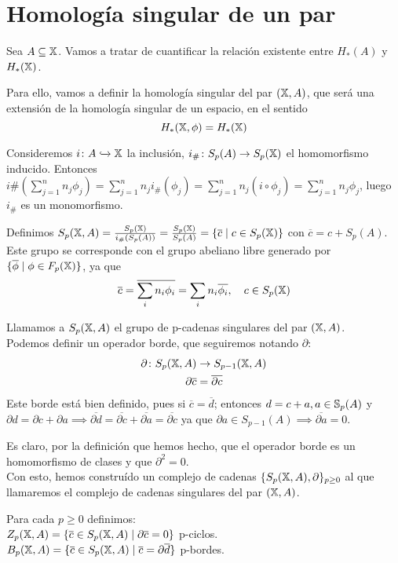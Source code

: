 \section{Homología singular de un par}

Sea $A \subseteq \X$. Vamos a tratar de cuantificar la relación existente entre $H_*(A)$ y $H_*(\X)$.

Para ello, vamos a definir la homología singular del par $(\X, A)$, que será una extensión de la homología singular de un espacio, en el sentido
\[H_*(\X, \phi) = H_*(\X)\]

Consideremos $i \colon A \xhookrightarrow{} \X$ la inclusión, $i_\# \colon S_p(A) \to \SX{p}$ el homomorfismo inducido.
Entonces $i\#(\sum\limits_{j = 1}^n n_j \phi_j) = \sum\limits_{j = 1}^n n_j i_\#(\phi_j) = \sum\limits_{j = 1}^n n_j (i \circ \phi_j) = \sum\limits_{j = 1}^n n_j \phi_j$,
luego $i_\#$ es un monomorfismo.

Definimos $S_p(\X, A) = \frac{\SX{p}}{i_\#(S_p(A))} = \frac{\SX{p}}{S_p(A)} = \{\overline{c} \mid c \in \SX{p} \}$ con $\overline{c} = c + S_p(A)$.
Este grupo se corresponde con el grupo abeliano libre generado por $\{\overline{\phi} \mid \phi \in \FX{p}\}$, ya que
\[\overline{c} = \overline{\sum_i n_i \phi_i} = \sum_i n_i \overline{\phi_i}, \quad c \in \SX{p} \]

Llamamos a $S_p(\X, A)$ el grupo de p-cadenas singulares del par $(\X, A)$. \\
Podemos definir un operador borde, que seguiremos notando $\partial$:
\begin{align*}
  \partial \colon S_p(\X, A) &\to S_{p-1}(\X, A) \\
  \partial \overline{c} &= \overline{\partial c}
\end{align*}
Este borde está bien definido, pues si $\overline{c} = \overline{d}$; entonces $d = c + a, a \in \S_p(A)$ y
$\partial d = \partial c + \partial a \implies \overline{\partial d} = \overline{\partial c} + \overline{\partial a} = \overline{\partial c}$ ya que
$\partial a \in S_{p-1}(A) \implies \overline{\partial a} = 0$.

Es claro, por la definición que hemos hecho, que el operador borde es un homomorfismo de clases y que $\partial^2 = 0$. \\
Con esto, hemos construído un complejo de cadenas $\{S_p(\X, A), \partial\}_{p \geq 0}$ al que llamaremos el complejo de cadenas singulares del par $(\X, A)$.

Para cada $p \geq 0$ definimos: \\
$Z_p(\X, A) = \{\overline{c} \in S_p(\X, A) \mid \partial\overline{c} = 0\}$ p-ciclos. \\
$B_p(\X, A) = \{\overline{c} \in S_p(\X, A) \mid \overline{c} = \partial\overline{d} \}$ p-bordes.

